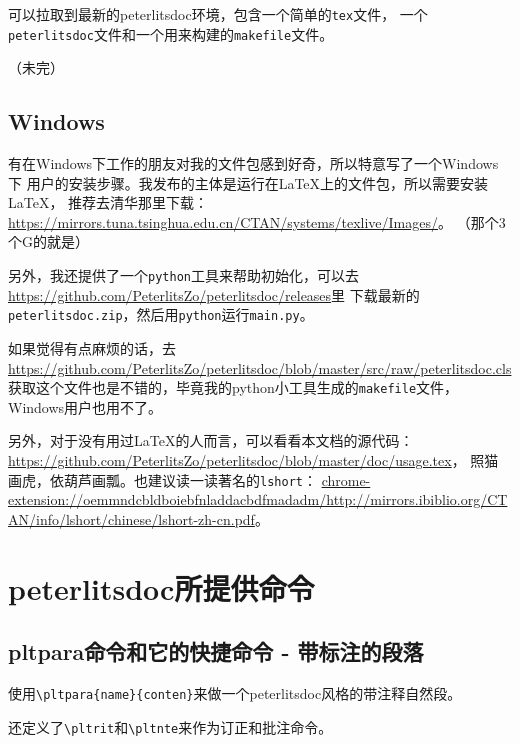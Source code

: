 \documentclass{peterlitsdoc}
\newcommand{\vb}{\verb}
\begin{document}
可以拉取到最新的peterlitsdoc环境，包含一个简单的\vb|tex|文件，
一个\vb|peterlitsdoc|文件和一个用来构建的\vb|makefile|文件。

（未完）

\subsection{Windows}

有在Windows下工作的朋友对我的文件包感到好奇，所以特意写了一个Windows下
用户的安装步骤。我发布的主体是运行在\LaTeX{}上的文件包，所以需要安装\LaTeX{}，
推荐去清华那里下载：%
\url{https://mirrors.tuna.tsinghua.edu.cn/CTAN/systems/texlive/Images/}。
（那个3个G的就是）

另外，我还提供了一个\vb|python|工具来帮助初始化，可以去%
\url{https://github.com/PeterlitsZo/peterlitsdoc/releases}里
下载最新的\vb|peterlitsdoc.zip|，然后用\vb|python|运行\vb|main.py|。

如果觉得有点麻烦的话，去%
\url{https://github.com/PeterlitsZo/peterlitsdoc/blob/master/src/raw/peterlitsdoc.cls}
获取这个文件也是不错的，毕竟我的python小工具生成的\vb|makefile|文件，
Windows用户也用不了。

另外，对于没有用过\LaTeX{}的人而言，可以看看本文档的源代码：%
\url{https://github.com/PeterlitsZo/peterlitsdoc/blob/master/doc/usage.tex}，
照猫画虎，依葫芦画瓢。也建议读一读著名的\vb|lshort|：%
\url{chrome-extension://oemmndcbldboiebfnladdacbdfmadadm/http://mirrors.ibiblio.org/CTAN/info/lshort/chinese/lshort-zh-cn.pdf}。


\section{peterlitsdoc所提供命令}


\subsection{pltpara命令和它的快捷命令 - 带标注的段落}

使用\vb|\pltpara{name}{conten}|来做一个peterlitsdoc风格的带注释自然段。
\begin{pltrun}
\end{pltrun}

还定义了\vb|\pltrit|和\verb|\pltnte|来作为订正和批注命令。
\begin{pltrun}
\end{pltrun}
\end{document}
